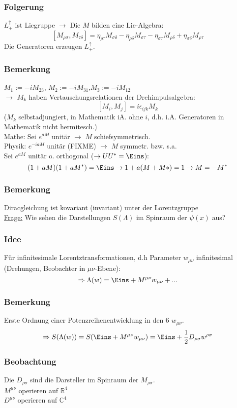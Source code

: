 \documentclass[twoside,a4paper]{scrartcl}
\newcommand{\R}{\mathbb{R}}
\newcommand{\C}{\mathbb{C}}
\renewcommand{\1}{\mathds{1}}
\newcommand{\Ra}{\Rightarrow}
\newcommand{\ra}{\rightarrow}
\renewcommand{\L}{\Lambda}
\renewcommand{\R}{\mathbb{R}}
\renewcommand{\C}{\mathbb{C}}
\begin{document}
\subsubsection*{Folgerung}
$L_+^\uparrow$ ist Liegruppe $\ra$ Die $M$ bilden eine Lie-Algebra:
$$[M_{\rho\sigma},M_{\tau\delta}]=\eta_{\rho\tau}M_{\sigma\delta}-\eta_{\rho\delta}M_{\sigma\tau}-\eta_{\sigma\tau}M_{\rho\delta}+\eta_{\sigma\delta}M_{\rho\tau}$$
Die Generatoren erzeugen $L_+^\uparrow$.
\subsubsection*{Bemerkung}
$M_1:=-iM_{23}$, $M_2:=-iM_{31}$,$M_3:=-iM_{12}$\\
$\ra$ $M_k$ haben Vertauschungsrelationen der Drehimpulsalgebra:
$$[M_i,M_j]=i\epsilon_{ijk}M_k$$
($M_k$ selbstadjungiert, in Mathematik iA. ohne $i$, d.h. i.A. Generatoren in Mathematik nicht hermitesch.)\\
Mathe: Sei $e^{aM}$ unitär $\ra$ $M$ schiefsymmetrisch.\\
Physik: $e^{-iaM}$ unitär (FIXME)  $\ra$ $M$ symmetr. bzw. s.a.\\
Sei $e^{aM}$ unitär o. orthogonal ($\ra UU^*=\Eins$):
$$(1+aM)(1+aM^*)=\Eins \ra 1+a(M+M*)=1 \ra M=-M^*$$
% 
\subsubsection*{Bemerkung}
Diracgleichung ist kovariant (invariant) unter der Lorentzgruppe\\
\underline{Frage:} Wie sehen die Darstellungen $S(\L)$ im Spinraum der $\psi(x)$ aus?
\subsubsection*{Idee}
Für infinitesimale Lorentztransformationen, d.h Parameter $w_{\mu\nu}$ infinitesimal (Drehungen, Beobachter in $\mu\nu$-Ebene):
$$\Ra \L(w)=\Eins+M^{\mu\nu}w_{\mu\nu}+...$$
\subsubsection*{Bemerkung}
Erste Ordnung einer Potenzreihenentwicklung in den 6 $w_{\mu\nu}$.\\
$$\Ra S(\L(w))=S(\Eins+M^{\mu\nu}w_{\mu\nu})=\Eins+\frac{1}{2}D_{\rho\sigma}w^{\rho\sigma}$$
\subsubsection*{Beobachtung}
Die $D_{\rho\sigma}$ sind die Darsteller im Spinraum der $M_{\rho\sigma}$.\\
$M^{\mu\nu}$ operieren auf $\R^4$\\
$D^{\mu\nu}$ operieren auf $\C^4$
\end{document}
